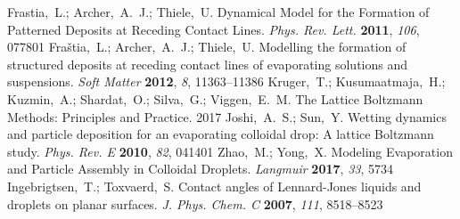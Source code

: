 \documentclass[journal=langd5,manuscript=article]{achemso}
\begin{document}
\begin{mcitethebibliography}{71}
\mciteSetBstMidEndSepPunct{\mcitedefaultmidpunct}
{\mcitedefaultendpunct}{\mcitedefaultseppunct}\relax
\EndOfBibitem
{}
Frastia,~L.; Archer,~A.~J.; Thiele,~U. Dynamical Model for the Formation of
  Patterned Deposits at Receding Contact Lines. \emph{Phys. Rev. Lett.}
  \textbf{2011}, \emph{106}, 077801\relax
\mciteBstWouldAddEndPuncttrue
\mciteSetBstMidEndSepPunct{\mcitedefaultmidpunct}
{\mcitedefaultendpunct}{\mcitedefaultseppunct}\relax
\EndOfBibitem
{}
Fra{\v{s}}tia,~L.; Archer,~A.~J.; Thiele,~U. Modelling the formation of
  structured deposits at receding contact lines of evaporating solutions and
  suspensions. \emph{Soft Matter} \textbf{2012}, \emph{8}, 11363--11386\relax
\mciteBstWouldAddEndPuncttrue
\mciteSetBstMidEndSepPunct{\mcitedefaultmidpunct}
{\mcitedefaultendpunct}{\mcitedefaultseppunct}\relax
\EndOfBibitem
{}
Kruger,~T.; Kusumaatmaja,~H.; Kuzmin,~A.; Shardat,~O.; Silva,~G.; Viggen,~E.~M.
  The Lattice Boltzmann Methods: Principles and Practice. 2017\relax
\mciteBstWouldAddEndPuncttrue
\mciteSetBstMidEndSepPunct{\mcitedefaultmidpunct}
{\mcitedefaultendpunct}{\mcitedefaultseppunct}\relax
\EndOfBibitem
{}
Joshi,~A.~S.; Sun,~Y. Wetting dynamics and particle deposition for an
  evaporating colloidal drop: A lattice Boltzmann study. \emph{Phys. Rev. E}
  \textbf{2010}, \emph{82}, 041401\relax
\mciteBstWouldAddEndPuncttrue
\mciteSetBstMidEndSepPunct{\mcitedefaultmidpunct}
{\mcitedefaultendpunct}{\mcitedefaultseppunct}\relax
\EndOfBibitem
{}
Zhao,~M.; Yong,~X. Modeling Evaporation and Particle Assembly in Colloidal
  Droplets. \emph{Langmuir} \textbf{2017}, \emph{33}, 5734\relax
\mciteBstWouldAddEndPuncttrue
\mciteSetBstMidEndSepPunct{\mcitedefaultmidpunct}
{\mcitedefaultendpunct}{\mcitedefaultseppunct}\relax
\EndOfBibitem
{}
Ingebrigtsen,~T.; Toxvaerd,~S. Contact angles of Lennard-Jones liquids and
  droplets on planar surfaces. \emph{J. Phys. Chem. C} \textbf{2007},
  \emph{111}, 8518--8523\relax
\mciteBstWouldAddEndPuncttrue
\mciteSetBstMidEndSepPunct{\mcitedefaultmidpunct}
{\mcitedefaultendpunct}{\mcitedefaultseppunct}\relax
\EndOfBibitem
{}

\end{mcitethebibliography}
\end{document}
